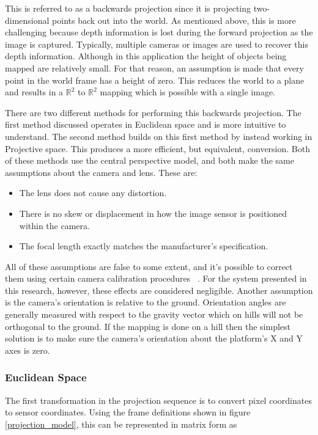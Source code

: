  This is referred to as a backwards projection since it is projecting two-dimensional points back out into the world.  As mentioned above, this is more challenging because depth information is lost during the forward projection as the image is captured.  Typically, multiple cameras or images are used to recover this depth information.  Although in this application the height of objects being mapped are relatively small.  For that reason, an assumption is made that every point in the world frame has a height of zero.  This reduces the world to a plane and results in a $\mathbb{R}^2$ to $\mathbb{R}^2$ mapping which is possible with a single image. 
 
 There are two different methods for performing this backwards projection. The first method discussed operates in Euclidean space and is more intuitive to understand.  The second method builds on this first method by instead working in Projective space.  This produces a more efficient, but equivalent, conversion.  Both of these methods use the central perspective model, and both make the same assumptions about the camera and lens.  These are:
 \begin{itemize}
 \item The lens does not cause any distortion. 
 \item There is no skew or displacement in how the image sensor is positioned within the camera.
 \item The focal length exactly matches the manufacturer's specification.
 \end{itemize}

 All of these assumptions are false to some extent, and it's possible to correct them using certain camera calibration procedures ~\citep{Zhang:1999}. For the system presented in this research, however, these effects are considered negligible.  Another assumption is the camera's orientation is relative to the ground.  Orientation angles are generally measured with respect to the gravity vector which on hills will not be orthogonal to the ground.  If the mapping is done on a hill then the simplest solution is to make sure the camera's orientation about the platform's X and Y axes is zero.
 
 \subsubsection{Euclidean Space}
 
 The first transformation in the projection sequence is to convert pixel coordinates to sensor coordinates.  Using the frame definitions shown in figure \ref{projection_model}, this can be represented in matrix form as 
 
